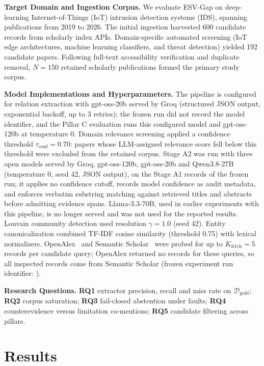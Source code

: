 \documentclass[runningheads]{llncs}
\newcommand{\method}{ESV-Gap}
\begin{document}
\noindent\textbf{Target Domain and Ingestion Corpus.} We evaluate \method{} on deep-learning Internet-of-Things (IoT) intrusion detection systems (IDS), spanning publications from 2019 to 2026. The initial ingestion harvested 600 candidate records from scholarly index APIs. Domain-specific automated screening (IoT edge architectures, machine learning classifiers, and threat detection) yielded 192 candidate papers. Following full-text accessibility verification and duplicate removal, $N = 150$ retained scholarly publications formed the primary study corpus.

\noindent\textbf{Model Implementations and Hyperparameters.} The pipeline is configured for relation extraction with gpt-oss-20b served by Groq (structured JSON output, exponential backoff, up to 3 retries); the frozen run did not record the model identifier, and the Pillar C evaluation runs this configured model and gpt-oss-120b at temperature 0. Domain relevance screening applied a confidence threshold $\tau_{\text{conf}} = 0.70$: papers whose LLM-assigned relevance score fell below this threshold were excluded from the retained corpus. Stage A2 was run with three open models served by Groq, gpt-oss-120b, gpt-oss-20b and Qwen3.8-27B (temperature 0, seed 42, JSON output), on the Stage A1 records of the frozen run; it applies no confidence cutoff, records model confidence as audit metadata, and enforces verbatim substring matching against retrieved titles and abstracts before admitting evidence spans. Llama-3.3-70B, used in earlier experiments with this pipeline, is no longer served and was not used for the reported results. Louvain community detection used resolution $\gamma = 1.0$ (seed 42). Entity canonicalization combined TF-IDF cosine similarity (threshold 0.75) with lexical normalizers. OpenAlex~\cite{openalex2022} and Semantic Scholar~\cite{semanticscholar2023} were probed for up to $K_{\text{fetch}} = 5$ records per candidate query; OpenAlex returned no records for these queries, so all inspected records come from Semantic Scholar (frozen experiment run identifier: ).

\noindent\textbf{Research Questions.} \textbf{RQ1} extractor precision, recall and miss rate on $\mathcal{D}_{\text{gold}}$; \textbf{RQ2} corpus saturation; \textbf{RQ3} fail-closed abstention under faults; \textbf{RQ4} counterevidence versus limitation co-mentions; \textbf{RQ5} candidate filtering across pillars.

\section{Results}
\label{sec:results}
\end{document}
